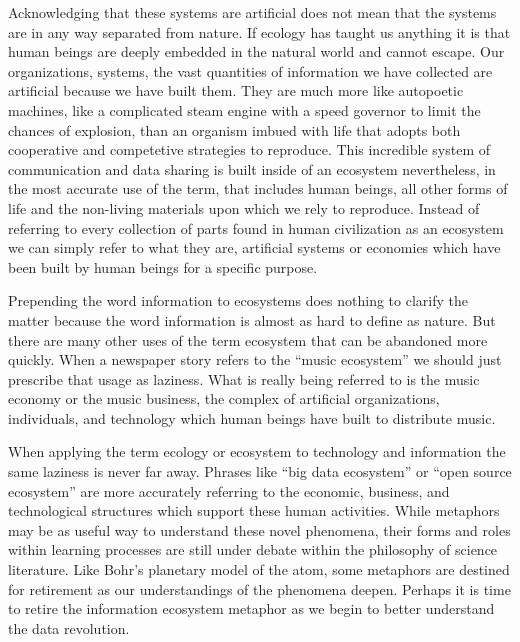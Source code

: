 Acknowledging that these systems are artificial does not mean that the systems are in any way separated from nature. If ecology has taught us anything it is that human beings are deeply embedded in the natural world and cannot escape. Our organizations, systems, the vast quantities of information we have collected are artificial because we have built them. They are much more like autopoetic machines, like a complicated steam engine with a speed governor to limit the chances of explosion, than an organism imbued with life that adopts both cooperative and competetive strategies to reproduce. This incredible system of communication and data sharing is built inside of an ecosystem nevertheless, in the most accurate use of the term, that includes human beings, all other forms of life and the non-living materials upon which we rely to reproduce. Instead of referring to every collection of parts found in human civilization as an ecosystem we can simply refer to what they are, artificial systems or economies which have been built by human beings for a specific purpose.

Prepending the word information to ecosystems does nothing to clarify the matter because the word information is almost as hard to define as nature. But there are many other uses of the term ecosystem that can be abandoned more quickly. When a newspaper story refers to the “music ecosystem” we should just prescribe that usage as laziness. What is really being referred to is the music economy or the music business, the complex of artificial organizations, individuals, and technology which human beings have built to distribute music.

When applying the term ecology or ecosystem to technology and information the same laziness is never far away. Phrases like “big data ecosystem” or “open source ecosystem” are more accurately referring to the economic, business, and technological structures which support these human activities. While metaphors may be as useful way to understand these novel phenomena, their forms and roles within learning processes are still under debate within the philosophy of science literature. Like Bohr's planetary model of the atom, some metaphors are destined for retirement as our understandings of the phenomena deepen. Perhaps it is time to retire the information ecosystem metaphor as we begin to better understand the data revolution.